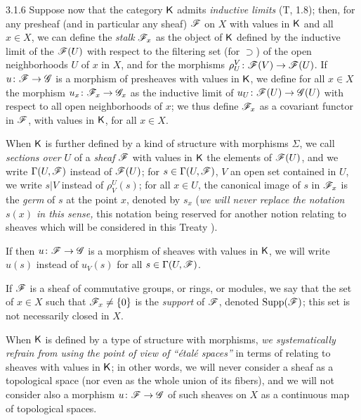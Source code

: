 \documentclass{book}
\begin{document}
\begin{env}{3.1.6}
\label{env-0.3.1.6}
Suppose now that the category $\mathsf{K}$ admits \emph{inductive limits} (T, 1.8);
then, for any presheaf (and in particular any sheaf) $\mathscr{F}$ on $X$ with
values in $\mathsf{K}$ and all $x\in X$, we can define the \emph{stalk} $\mathscr{F}_x$ as the object of $\mathsf{K}$ defined
by the inductive limit of the $\mathscr{F}(U)$ with respect to the filtering set
(for $\supset$) of the open neighborhoods $U$ of $x$ in $X$, and for the morphisms $\rho_U^V\colon\mathscr{F}(V)\to\mathscr{F}(U)$.
If $u\colon\mathscr{F}\to\mathscr{G}$ is a morphism of presheaves with values in $\mathsf{K}$, we define for all
$x\in X$ the morphism $u_x\colon\mathscr{F}_x\to\mathscr{G}_x$ as the inductive limit of $u_U\colon\mathscr{F}(U)\to\mathscr{G}(U)$ with respect to all
open neighborhoods of $x$; we thus define $\mathscr{F}_x$ as a covariant functor in $\mathscr{F}$, with values in $\mathsf{K}$, for
all $x\in X$.

When $\mathsf{K}$ is further defined by a kind of structure with morphisms $\Sigma$,
we call \emph{sections over $U$} of a \emph{sheaf} $\mathscr{F}$ with values in $\mathsf{K}$ the elements
of $\mathscr{F}(U)$, and we write $\Gamma(U,\mathscr{F})$ instead of $\mathscr{F}(U)$; for $s\in\Gamma(U,\mathscr{F})$, $V$ an open set
contained in $U$, we write $s|V$ instead of $\rho_V^U(s)$; for all $x\in U$, the canonical image
of $s$ in $\mathscr{F}_x$ is the \emph{germ} of $s$ at the point $x$, denoted by $s_x$ (\emph{we will never replace
the notation $s(x)$ in this sense,} this notation being reserved for another notion relating to sheaves
which will be considered in this Treaty ).

If then $u\colon\mathscr{F}\to\mathscr{G}$ is a morphism of sheaves with values in $\mathsf{K}$, we will write $u(s)$
instead of $u_V(s)$ for all $s\in\Gamma(U,\mathscr{F})$.

If $\mathscr{F}$ is a sheaf of commutative groups, or rings, or modules, we say
that the set of $x\in X$ such that $\mathscr{F}_x\neq\{0\}$ is the \emph{support} of $\mathscr{F}$, denoted
${\mathop{\mathrm{Supp}}\nolimits}(\mathscr{F})$; this set is not necessarily closed in $X$.

When $\mathsf{K}$ is defined by a type of structure with morphisms, \emph{we
systematically refrain from using the point of view of ``{\'e}tal{\'e} spaces''} in terms of
relating to sheaves with values in $\mathsf{K}$; in other words, we will never consider
a sheaf as a topological space (nor even as the whole union of its
fibers), and we will not consider also a morphism $u\colon\mathscr{F}\to\mathscr{G}$ of such sheaves
on $X$ as a continuous map of topological spaces.
\end{env}
\end{document}
